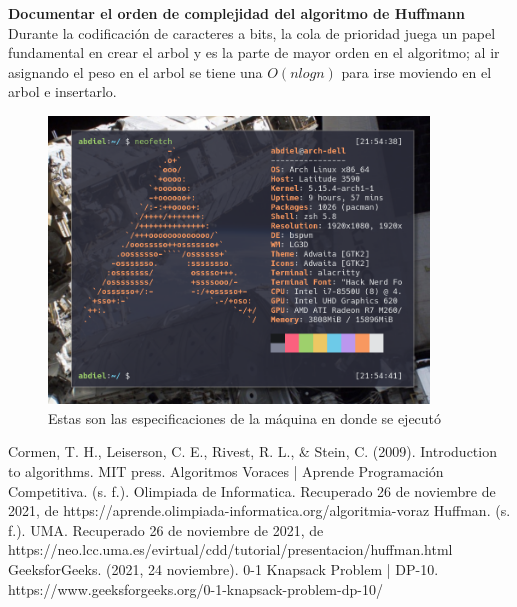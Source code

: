 \documentclass{article}
\begin{document}
    \textbf{Documentar el orden de complejidad del algoritmo de Huffmann}\\
    Durante la codificación de caracteres a bits, la cola de prioridad juega un papel fundamental en crear el arbol y es la parte de mayor orden en el algoritmo; al ir asignando el peso en el arbol se tiene una $O(nlogn)$ para irse moviendo en el arbol e insertarlo. 
    \newpage
    \begin{figure}[h!]
        \centering
        \includegraphics[width=0.9\textwidth]{specs.png}
        \caption{Estas son las especificaciones de la máquina en donde se ejecutó}
        \label{fig:my_label}
    \end{figure}
\newpage    
        
\begin{thebibliography}{}
    
        Cormen, T. H., Leiserson, C. E., Rivest, R. L., & Stein, C. (2009). Introduction to algorithms. MIT press.
        Algoritmos Voraces | Aprende Programación Competitiva. (s. f.). Olimpiada de Informatica. Recuperado 26 de noviembre de 2021, de https://aprende.olimpiada-informatica.org/algoritmia-voraz
        Huffman. (s. f.). UMA. Recuperado 26 de noviembre de 2021, de https://neo.lcc.uma.es/evirtual/cdd/tutorial/presentacion/huffman.html
        GeeksforGeeks. (2021, 24 noviembre). 0-1 Knapsack Problem | DP-10. https://www.geeksforgeeks.org/0-1-knapsack-problem-dp-10/
    \end{thebibliography}
\end{document}
